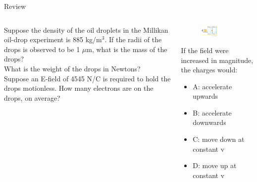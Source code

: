 \documentclass{beamer}
\begin{document}
\begin{frame}{Review}
\begin{columns}[T]
\begin{column}{0.4\textwidth}
\small
Suppose the density of the oil droplets in the Millikan oil-drop experiment is 885 kg/m$^3$.  If the radii of the drops is observed to be 1 $\mu$m, what is the mass of the drops? \\ \vspace{0.5cm}
What is the weight of the drops in Newtons? \\
\vspace{0.5cm}
Suppose an E-field of 4545 N/C is required to hold the drops motionless.  How many electrons are on the drops, on average?
\end{column}
\begin{column}{0.6\textwidth}
\begin{figure}
\centering
\includegraphics[width=0.5\textwidth]{ex2.png}
\caption{\label{fig:ex2}}
\end{figure}
\small 
If the field were increased in magnitude, the charges would:
\begin{itemize}
\item A: accelerate upwards
\item B: accelerate downwards
\item C: move down at constant v
\item D: move up at constant v
\end{itemize}
\end{column}
\end{columns}
\end{frame}
\end{document}
